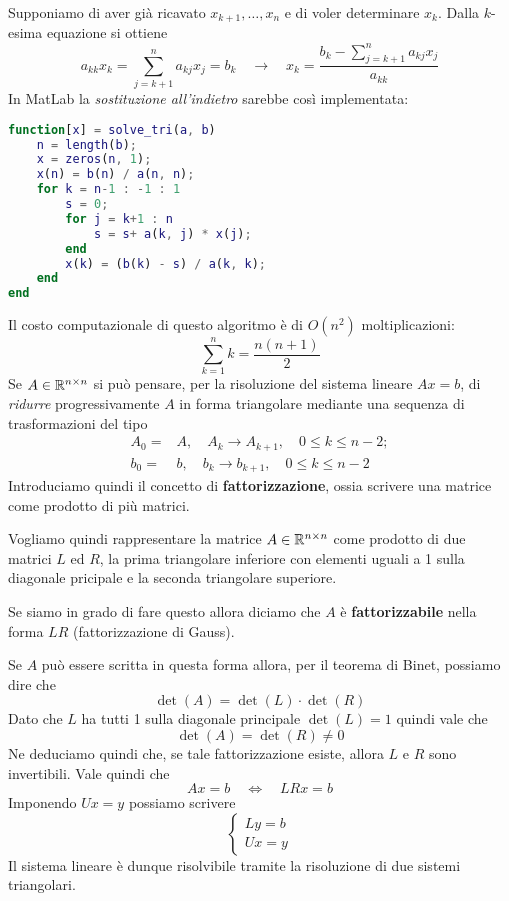 Supponiamo di aver già ricavato $x_{k+1}, \dots, x_n$ e di voler determinare $x_k$. Dalla $k$-esima equazione si
ottiene
\[
	a_{kk} x_k = \sum_{j=k+1}^n a_{kj} x_j = b_k \quad \to \quad
	x_k = \frac{b_k - \displaystyle\sum_{j=k+1}^n a_{kj} x_j}{a_{kk}}
\]
In MatLab la \emph{sostituzione all'indietro} sarebbe così implementata:
\begin{lstlisting}[language=matlab]
function[x] = solve_tri(a, b)
	n = length(b);
	x = zeros(n, 1);
	x(n) = b(n) / a(n, n);
	for k = n-1 : -1 : 1
		s = 0;
		for j = k+1 : n
			s = s+ a(k, j) * x(j);
		end
		x(k) = (b(k) - s) / a(k, k);
	end
end
\end{lstlisting}
Il costo computazionale di questo algoritmo è di $O(n^2)$ moltiplicazioni:
\[ \sum_{k=1}^n k = \frac{n (n + 1)}{2} \]
Se $A \in \mathbb{R}^{n \times n}$ si può pensare, per la risoluzione del sistema lineare $A x = b$, di \emph{ridurre}
progressivamente $A$ in forma triangolare mediante una sequenza di trasformazioni del tipo
\begin{align*}
	A_0 = & A, \quad A_k \to A_{k+1}, \quad 0 \leq k \leq n - 2; \\
	b_0 = & b, \quad b_k \to b_{k+1}, \quad 0 \leq k \leq n - 2
\end{align*}
Introduciamo quindi il concetto di \textbf{fattorizzazione}, ossia scrivere una matrice come prodotto di più
matrici.

Vogliamo quindi rappresentare la matrice $A \in \mathbb{R}^{n \times n}$ come prodotto di due matrici $L$ ed $R$, la
prima triangolare inferiore con elementi uguali a 1 sulla diagonale pricipale e la seconda triangolare superiore.

Se siamo in grado di fare questo allora diciamo che $A$ è \textbf{fattorizzabile} nella forma $LR$
(fattorizzazione di Gauss).

\begin{observation}
	Se $A$ può essere scritta in questa forma allora, per il teorema di Binet, possiamo dire che
	\[ \det(A) = \det(L) \cdot \det(R) \]
	Dato che $L$ ha tutti 1 sulla diagonale principale $\det(L) = 1$ quindi vale che
	\[ \det(A) = \det(R) \neq 0 \]
	Ne deduciamo quindi che, se tale fattorizzazione esiste, allora $L$ e $R$ sono invertibili. Vale quindi che
	\[ A x = b \quad \Leftrightarrow \quad LR x = b \]
	Imponendo $U x = y$ possiamo scrivere
	\[
		\begin{cases}
			L y = b \\
			U x = y
		\end{cases}
	\]
	Il sistema lineare è dunque risolvibile tramite la risoluzione di due sistemi triangolari.
\end{observation}

